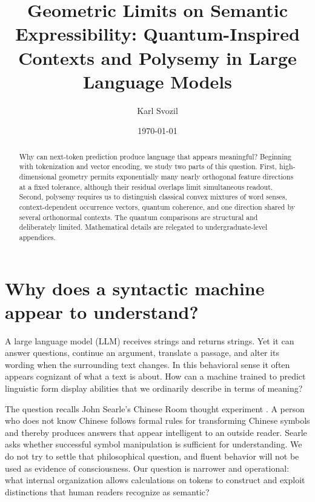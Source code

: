 \documentclass[
  aps,
  reprint,
  superscriptaddress,
  floatfix,
  nofootinbib,
  longbibliography
]{revtex4-2}
\begin{document}
\title{Geometric Limits on Semantic Expressibility: Quantum-Inspired Contexts and Polysemy in Large Language Models}

\author{Karl Svozil}

\date{\today}

\begin{abstract}
Why can next-token prediction produce language that appears meaningful?
Beginning with tokenization and vector encoding, we study two parts of this
question.  First, high-dimensional geometry permits exponentially many nearly
orthogonal feature directions at a fixed tolerance, although their residual
overlaps limit simultaneous readout.  Second, polysemy requires us to
distinguish classical convex mixtures of word senses, context-dependent
occurrence vectors, quantum coherence, and one direction shared by several
orthonormal contexts.  The quantum comparisons are structural and deliberately
limited.  Mathematical details are relegated to undergraduate-level
appendices.
\end{abstract}

\maketitle

\section{Why does a syntactic machine appear to understand?}
\label{sec:puzzle}

A large language model (LLM) receives strings and returns strings.  Yet it can
answer questions, continue an argument, translate a passage, and alter its
wording when the surrounding text changes.  In this behavioral sense it often
appears cognizant of what a text is about.  How can a machine trained to
predict linguistic form display abilities that we ordinarily describe in
terms of meaning?

The question recalls John Searle's Chinese Room thought experiment
\cite{searl-80a}.  A person who does not know Chinese follows formal rules for
transforming Chinese symbols and thereby produces answers that appear
intelligent to an outside reader.  Searle asks whether successful symbol
manipulation is sufficient for understanding.  We do not try to settle that
philosophical question, and fluent behavior will not be used as evidence of
consciousness.  Our question is narrower and operational: what internal
organization allows calculations on tokens to construct and exploit distinctions that
human readers recognize as semantic?
\end{document}
